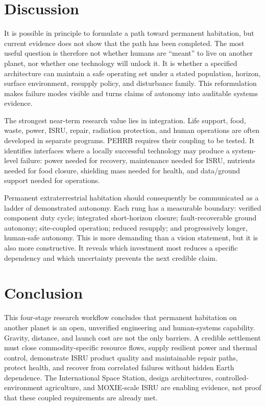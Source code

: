 \documentclass[10pt,conference]{IEEEtran}
\begin{document}
\section{Discussion}
\label{sec:discussion}

It is possible in principle to formulate a path toward permanent habitation, but current evidence does not show that the path has been completed. The most useful question is therefore not whether humans are ``meant'' to live on another planet, nor whether one technology will unlock it. It is whether a specified architecture can maintain a safe operating set under a stated population, horizon, surface environment, resupply policy, and disturbance family. This reformulation makes failure modes visible and turns claims of autonomy into auditable systems evidence.

The strongest near-term research value lies in integration. Life support, food, waste, power, ISRU, repair, radiation protection, and human operations are often developed in separate programs. PEHRB requires their coupling to be tested. It identifies interfaces where a locally successful technology may produce a system-level failure: power needed for recovery, maintenance needed for ISRU, nutrients needed for food closure, shielding mass needed for health, and data/ground support needed for operations.

Permanent extraterrestrial habitation should consequently be communicated as a ladder of demonstrated autonomy. Each rung has a measurable boundary: verified component duty cycle; integrated short-horizon closure; fault-recoverable ground autonomy; site-coupled operation; reduced resupply; and progressively longer, human-safe autonomy. This is more demanding than a vision statement, but it is also more constructive. It reveals which investment most reduces a specific dependency and which uncertainty prevents the next credible claim.

\section{Conclusion}
\label{sec:conclusion}

This four-stage research workflow concludes that permanent habitation on another planet is an open, unverified engineering and human-systems capability. Gravity, distance, and launch cost are not the only barriers. A credible settlement must close commodity-specific resource flows, supply resilient power and thermal control, demonstrate ISRU product quality and maintainable repair paths, protect health, and recover from correlated failures without hidden Earth dependence. The International Space Station, design architectures, controlled-environment agriculture, and MOXIE-scale ISRU are enabling evidence, not proof that these coupled requirements are already met.
\end{document}
